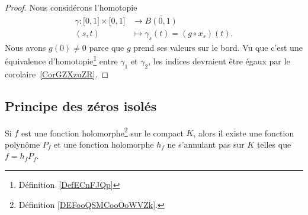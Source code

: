 \begin{proof}
	Nous considérons l'homotopie
	\begin{equation}
		\begin{aligned}
			\gamma\colon \mathopen[ 0 , 1 \mathclose]\times \mathopen[ 0 , 1 \mathclose] & \to \overline{ B(0,1) }              \\
			(s,t)                                                                        & \mapsto \gamma_s(t)=(g\circ x_s)(t).
		\end{aligned}
	\end{equation}
	Nous avons \( g(0)\neq 0\) parce que \( g\) prend ses valeurs sur le bord. Vu que c'est une équivalence d'homotopie\footnote{Définition~\ref{DefECnFJQp}} entre \( \gamma_1\) et \( \gamma_2\), les indices devraient être égaux par le corolaire~\ref{CorGZXzuZR}.
\end{proof}

\subsection{Principe des zéros isolés}

\begin{lemma}   \label{LEMooYYZQooClmOgG}
	Si \( f\) est une fonction holomorphe\footnote{Définition \ref{DEFooQSMCooOoWVZk}.} sur le compact \( K\), alors il existe une fonction polynôme \( P_f\) et une fonction holomorphe \( h_f \) ne s'annulant pas sur \( K\) telles que \( f=h_fP_f \).
\end{lemma}


